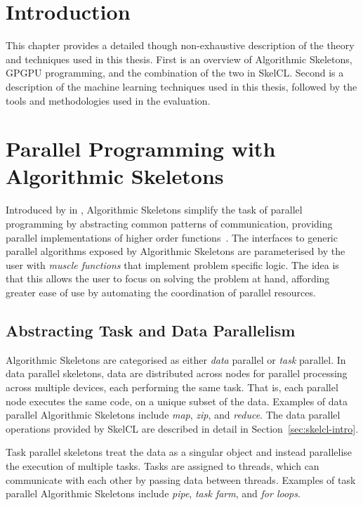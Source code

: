 \section{Introduction}

This chapter provides a detailed though non-exhaustive description of
the theory and techniques used in this thesis. First is an overview of
Algorithmic Skeletons, GPGPU programming, and the combination of the
two in SkelCL. Second is a description of the machine learning
techniques used in this thesis, followed by the tools and
methodologies used in the evaluation.


\section{Parallel Programming with Algorithmic Skeletons}

Introduced by \citeauthor{Cole1989} in \citeyear{Cole1989},
Algorithmic Skeletons simplify the task of parallel programming by
abstracting common patterns of communication, providing parallel
implementations of higher order functions~\cite{Cole1989}. The
interfaces to generic parallel algorithms exposed by Algorithmic
Skeletons are parameterised by the user with \emph{muscle functions}
that implement problem specific logic. The idea is that this allows
the user to focus on solving the problem at hand, affording greater
ease of use by automating the coordination of parallel resources.


\subsection{Abstracting Task and Data Parallelism}

Algorithmic Skeletons are categorised as either \emph{data} parallel
or \emph{task} parallel. In data parallel skeletons, data are
distributed across nodes for parallel processing across multiple
devices, each performing the same task. That is, each parallel node
executes the same code, on a unique subset of the data. Examples of
data parallel Algorithmic Skeletons include \emph{map}, \emph{zip},
and \emph{reduce}. The data parallel operations provided by SkelCL are
described in detail in Section~\ref{sec:skelcl-intro}.

Task parallel skeletons treat the data as a singular object and
instead parallelise the execution of multiple tasks. Tasks are
assigned to threads, which can communicate with each other by passing
data between threads. Examples of task parallel Algorithmic Skeletons
include \emph{pipe}, \emph{task farm}, and \emph{for loops}.


